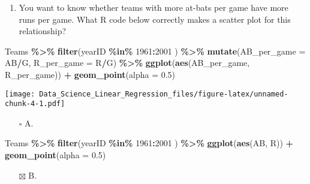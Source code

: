 \documentclass[
]{article}
\newenvironment{Shaded}{\begin{snugshade}}{\end{snugshade}}
\newcommand{\DataTypeTok}[1]{\textcolor[rgb]{0.13,0.29,0.53}{#1}}
\newcommand{\DecValTok}[1]{\textcolor[rgb]{0.00,0.00,0.81}{#1}}
\newcommand{\FloatTok}[1]{\textcolor[rgb]{0.00,0.00,0.81}{#1}}
\newcommand{\KeywordTok}[1]{\textcolor[rgb]{0.13,0.29,0.53}{\textbf{#1}}}
\newcommand{\NormalTok}[1]{#1}
\newcommand{\OperatorTok}[1]{\textcolor[rgb]{0.81,0.36,0.00}{\textbf{#1}}}
\newcommand{\StringTok}[1]{\textcolor[rgb]{0.31,0.60,0.02}{#1}}
\providecommand{\tightlist}{%
  \setlength{\itemsep}{0pt}\setlength{\parskip}{0pt}}
\begin{document}
\begin{enumerate}
\def\labelenumi{\arabic{enumi}.}
\setcounter{enumi}{3}
\tightlist
\item
  You want to know whether teams with more at-bats per game have more
  runs per game. What R code below correctly makes a scatter plot for
  this relationship?
\end{enumerate}

\begin{Shaded}
\begin{Highlighting}[]
\NormalTok{Teams }\OperatorTok{\%\textgreater{}\%}\StringTok{ }\KeywordTok{filter}\NormalTok{(yearID }\OperatorTok{\%in\%}\StringTok{ }\DecValTok{1961}\OperatorTok{:}\DecValTok{2001}\NormalTok{ ) }\OperatorTok{\%\textgreater{}\%}
\StringTok{    }\KeywordTok{mutate}\NormalTok{(}\DataTypeTok{AB\_per\_game =}\NormalTok{ AB}\OperatorTok{/}\NormalTok{G, }\DataTypeTok{R\_per\_game =}\NormalTok{ R}\OperatorTok{/}\NormalTok{G) }\OperatorTok{\%\textgreater{}\%}
\StringTok{    }\KeywordTok{ggplot}\NormalTok{(}\KeywordTok{aes}\NormalTok{(AB\_per\_game, R\_per\_game)) }\OperatorTok{+}\StringTok{ }
\StringTok{    }\KeywordTok{geom\_point}\NormalTok{(}\DataTypeTok{alpha =} \FloatTok{0.5}\NormalTok{)}
\end{Highlighting}
\end{Shaded}

\texttt{[image: Data\_Science\_Linear\_Regression\_files/figure-latex/unnamed-chunk-4-1.pdf]}

\begin{itemize}
\tightlist
\item[$\square$]
  A.
\end{itemize}

\begin{Shaded}
\begin{Highlighting}[]
\NormalTok{Teams }\OperatorTok{\%\textgreater{}\%}\StringTok{ }\KeywordTok{filter}\NormalTok{(yearID }\OperatorTok{\%in\%}\StringTok{ }\DecValTok{1961}\OperatorTok{:}\DecValTok{2001}\NormalTok{ ) }\OperatorTok{\%\textgreater{}\%}
\StringTok{    }\KeywordTok{ggplot}\NormalTok{(}\KeywordTok{aes}\NormalTok{(AB, R)) }\OperatorTok{+}\StringTok{ }
\StringTok{    }\KeywordTok{geom\_point}\NormalTok{(}\DataTypeTok{alpha =} \FloatTok{0.5}\NormalTok{)}
\end{Highlighting}
\end{Shaded}

\begin{itemize}
\tightlist
\item[$\boxtimes$]
  B.
\end{itemize}
\end{document}
